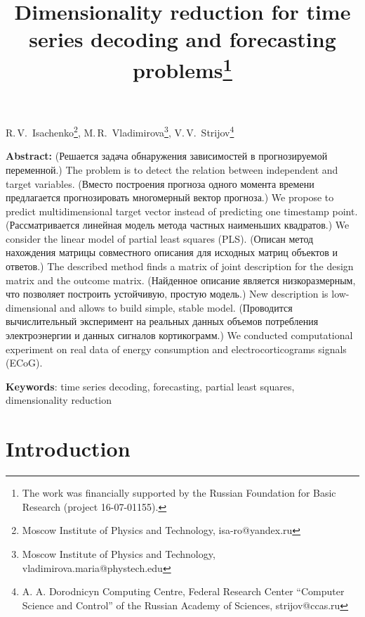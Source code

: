 \documentclass[12pt,twoside]{article}
\begin{document}
	\title
	{Dimensionality reduction for time series decoding and forecasting problems\thanks{The work was financially supported by the Russian Foundation for Basic Research (project 16-07-01155).}}
	\date{}
	\maketitle
	\begin{center}
		R.\,V.~Isachenko\footnote{Moscow Institute of Physics and Technology, isa-ro@yandex.ru},
		M.\,R.~Vladimirova\footnote{Moscow Institute of Physics and Technology, vladimirova.maria@phystech.edu},
		V.\,V.~Strijov\footnote{A. A. Dorodnicyn Computing Centre, Federal Research Center “Computer Science and Control” of the Russian Academy of Sciences, strijov@ccas.ru}
	\end{center}
	\textbf{Abstract:} 
	(Решается задача обнаружения зависимостей в прогнозируемой переменной.) 
	The problem is to detect the relation between independent and target variables.
	(Вместо построения прогноза одного момента времени предлагается прогнозировать многомерный вектор прогноза.)
	We propose to predict multidimensional target vector instead of predicting one timestamp point.
	(Рассматривается линейная модель метода частных наименьших квадратов.)
	We consider the linear model of partial least squares (PLS).
	(Описан метод нахождения матрицы совместного описания для исходных матриц объектов и ответов.)
	The described method finds a matrix of joint description for the design matrix and the outcome matrix.
	(Найденное описание является низкоразмерным, что позволяет построить устойчивую, простую модель.)
	New description is low-dimensional and allows to build simple, stable model.
	(Проводится вычислительный эксперимент на реальных данных объемов потребления электроэнергии и данных сигналов кортикограмм.)
	We conducted computational experiment on real data of energy consumption and electrocorticograms signals (ECoG).
	
	\bigskip
	\textbf{Keywords}: time series decoding, forecasting, partial least squares, dimensionality reduction

\linenumbers
\section{Introduction}
\end{document}
